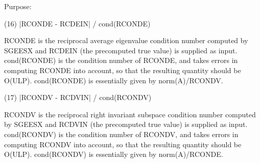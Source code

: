 \begin{DoxyParagraph}{Purpose\+: }
\begin{DoxyVerb}
   (16)  |RCONDE - RCDEIN| / cond(RCONDE)

      RCONDE is the reciprocal average eigenvalue condition number
      computed by SGEESX and RCDEIN (the precomputed true value)
      is supplied as input.  cond(RCONDE) is the condition number
      of RCONDE, and takes errors in computing RCONDE into account,
      so that the resulting quantity should be O(ULP). cond(RCONDE)
      is essentially given by norm(A)/RCONDV.

   (17)  |RCONDV - RCDVIN| / cond(RCONDV)

      RCONDV is the reciprocal right invariant subspace condition
      number computed by SGEESX and RCDVIN (the precomputed true
      value) is supplied as input. cond(RCONDV) is the condition
      number of RCONDV, and takes errors in computing RCONDV into
      account, so that the resulting quantity should be O(ULP).
      cond(RCONDV) is essentially given by norm(A)/RCONDE.\end{DoxyVerb}
 
\end{DoxyParagraph}

